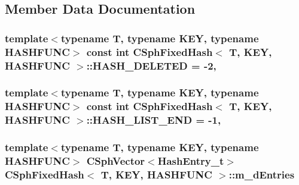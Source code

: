 \subsection{Member Data Documentation}
\hypertarget{classCSphFixedHash_ae2fa3ad3688e80830a3d38edf8049d61}{
\subsubsection[{H\-A\-S\-H\-\_\-\-D\-E\-L\-E\-T\-E\-D}]{\setlength{\rightskip}{0pt plus 5cm}template$<$typename T, typename K\-E\-Y, typename H\-A\-S\-H\-F\-U\-N\-C$>$ const {\bf int} {\bf C\-Sph\-Fixed\-Hash}$<$ T, K\-E\-Y, H\-A\-S\-H\-F\-U\-N\-C $>$\-::H\-A\-S\-H\-\_\-\-D\-E\-L\-E\-T\-E\-D = -\/2\hspace{0.3cm}{\ttfamily [static]}, {\ttfamily [protected]}}}\label{classCSphFixedHash_ae2fa3ad3688e80830a3d38edf8049d61}
\hypertarget{classCSphFixedHash_aa158f9c67eeeb94db05bf09125ba677d}{
\subsubsection[{H\-A\-S\-H\-\_\-\-L\-I\-S\-T\-\_\-\-E\-N\-D}]{\setlength{\rightskip}{0pt plus 5cm}template$<$typename T, typename K\-E\-Y, typename H\-A\-S\-H\-F\-U\-N\-C$>$ const {\bf int} {\bf C\-Sph\-Fixed\-Hash}$<$ T, K\-E\-Y, H\-A\-S\-H\-F\-U\-N\-C $>$\-::H\-A\-S\-H\-\_\-\-L\-I\-S\-T\-\_\-\-E\-N\-D = -\/1\hspace{0.3cm}{\ttfamily [static]}, {\ttfamily [protected]}}}\label{classCSphFixedHash_aa158f9c67eeeb94db05bf09125ba677d}
\hypertarget{classCSphFixedHash_aba1dc52d241597da01057190430e12a5}{
\subsubsection[{m\-\_\-d\-Entries}]{\setlength{\rightskip}{0pt plus 5cm}template$<$typename T, typename K\-E\-Y, typename H\-A\-S\-H\-F\-U\-N\-C$>$ {\bf C\-Sph\-Vector}$<${\bf Hash\-Entry\-\_\-t}$>$ {\bf C\-Sph\-Fixed\-Hash}$<$ T, K\-E\-Y, H\-A\-S\-H\-F\-U\-N\-C $>$\-::m\-\_\-d\-Entries\hspace{0.3cm}{\ttfamily [protected]}}}\label{classCSphFixedHash_aba1dc52d241597da01057190430e12a5}


